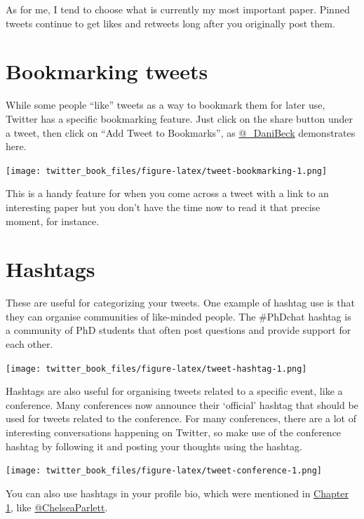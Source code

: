 \documentclass[
]{book}
\begin{document}
As for me, I tend to choose what is currently my most important paper. Pinned tweets continue to get likes and retweets long after you originally post them.

\hypertarget{bookmarking-tweets}{%
\section*{Bookmarking tweets}\label{bookmarking-tweets}}

While some people ``like'' tweets as a way to bookmark them for later use, Twitter has a specific bookmarking feature. Just click on the share button under a tweet, then click on ``Add Tweet to Bookmarks'', as \href{https://twitter.com/_DaniBeck}{@\_DaniBeck} demonstrates here.

\texttt{[image: twitter\_book\_files/figure-latex/tweet-bookmarking-1.png]}

This is a handy feature for when you come across a tweet with a link to an interesting paper but you don't have the time now to read it that precise moment, for instance.

\hypertarget{hashtags}{%
\section*{Hashtags}\label{hashtags}}

These are useful for categorizing your tweets. One example of hashtag use is that they can organise communities of like-minded people. The \#PhDchat hashtag is a community of PhD students that often post questions and provide support for each other.

\texttt{[image: twitter\_book\_files/figure-latex/tweet-hashtag-1.png]}

Hashtags are also useful for organising tweets related to a specific event, like a conference. Many conferences now announce their `official' hashtag that should be used for tweets related to the conference. For many conferences, there are a lot of interesting conversations happening on Twitter, so make use of the conference hashtag by following it and posting your thoughts using the hashtag.

\texttt{[image: twitter\_book\_files/figure-latex/tweet-conference-1.png]}

You can also use hashtags in your profile bio, which were mentioned in \protect\hyperlink{beginner}{Chapter 1}, like \href{https://twitter.com/@ChelseaParlett}{@ChelseaParlett}.
\end{document}
